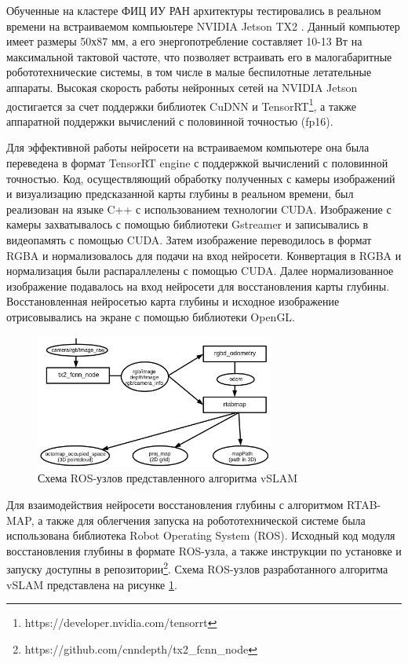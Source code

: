 \documentclass{mipt-thesis-ms}
\begin{document}
	Обученные на кластере ФИЦ ИУ РАН архитектуры тестировались в реальном времени на встраиваемом компьюьтере NVIDIA Jetson TX2 \cite{franklin2017nvidia}. Данный компьютер имеет размеры 50х87 мм, а его энергопотребление составляет 10-13 Вт на максимальной тактовой частоте, что позволяет встраивать его в малогабаритные робототехнические системы, в том числе в малые беспилотные летательные аппараты. Высокая скорость работы нейронных сетей на NVIDIA Jetson достигается за счет поддержки библиотек CuDNN и TensorRT\footnote{https://developer.nvidia.com/tensorrt}, а также аппаратной поддержки вычислений с половинной точностью (fp16).
	
	Для эффективной работы нейросети на встраиваемом компьютере она была переведена в формат TensorRT engine с поддержкой вычислений с половинной точностью. Код, осуществляющий обработку полученных с камеры изображений и визуализацию предсказанной карты глубины в реальном времени, был реализован на языке C++ с использованием технологии CUDA. Изображение с камеры захватывалось с помощью библиотеки Gstreamer и записывались в видеопамять с помощью CUDA. Затем изображение переводилось в формат RGBA и нормализовалось для подачи на вход нейросети. Конвертация в RGBA и нормализация были распараллелены с помощью CUDA. Далее нормализованное изображение подавалось на вход нейросети для восстановления карты глубины. Восстановленная нейросетью карта глубины и исходное изображение отрисовывались на экране с помощью библиотеки OpenGL.
	
	\begin{figure}
		\centering
		\includegraphics[width=0.7\textwidth]{img/rosnode_scheme.png}
		\caption{Схема ROS-узлов представленного алгоритма vSLAM}
		\label{figure_rosnode}
	\end{figure}
	
	Для взаимодействия нейросети восстановления глубины с алгоритмом RTAB-MAP, а также для облегчения запуска на робототехнической системе была использована библиотека Robot Operating System (ROS)\cite{koubaa2017robot}. Исходный код модуля восстановления глубины в формате ROS-узла, а также инструкции по установке и запуску доступны в репозитории\footnote{https://github.com/cnndepth/tx2\_fcnn\_node}. Схема ROS-узлов разработанного алгоритма vSLAM представлена на рисунке \ref{figure_rosnode}.
	
\end{document}

